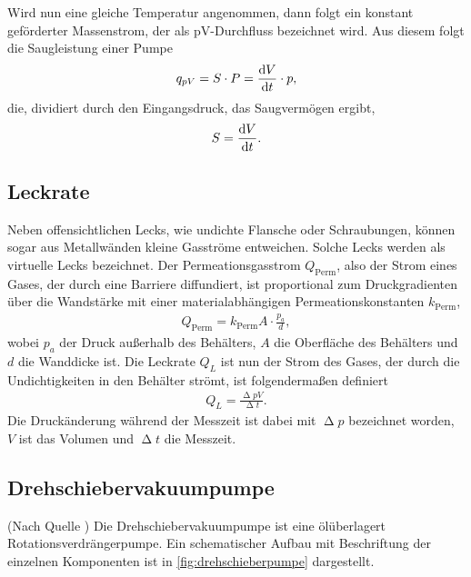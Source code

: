 \noindent
Wird nun eine gleiche Temperatur angenommen, dann folgt ein konstant geförderter Massenstrom, der als pV-Durchfluss bezeichnet wird. Aus diesem folgt die Saugleistung einer Pumpe
\begin{align}
    q_{pV} = S\cdot P=\frac{\text dV}{\text dt}\cdot p,
\end{align}
die, dividiert durch den Eingangsdruck, das Saugvermögen ergibt,
\begin{align}
    S=\frac{\text dV}{\text dt}.
\end{align}

\subsection{Leckrate}
\label{subsec:leckrate}

Neben offensichtlichen Lecks, wie undichte Flansche oder Schraubungen, können sogar aus Metallwänden kleine Gasströme entweichen. Solche Lecks werden als virtuelle Lecks bezeichnet.
Der Permeationsgasstrom $Q_{\text{Perm}}$, also der Strom eines Gases, der durch eine Barriere diffundiert, ist proportional zum Druckgradienten über die Wandstärke mit einer materialabhängigen Permeationskonstanten $k_{\text{Perm}}$,
\begin{align}
    \label{eqn:permeaStrom}
    Q_{\text{Perm}} = k_{\text{Perm}} A\cdot\frac{p_a}{d},
\end{align}
wobei $p_a$ der Druck außerhalb des Behälters, $A$ die Oberfläche des Behälters und $d$ die Wanddicke ist. Die Leckrate $Q_L$ ist nun der Strom des Gases, der durch die Undichtigkeiten in den Behälter strömt, ist folgendermaßen definiert
\begin{align}
    Q_L=\frac{\upDelta p V}{\upDelta t}.
\end{align}
Die Druckänderung während der Messzeit ist dabei mit $\upDelta p$ bezeichnet worden, $V$ ist das Volumen und $\upDelta t$ die Messzeit.

\subsection{Drehschiebervakuumpumpe}
\label{subsec:Drehschieberpumpe}

(Nach Quelle \cite{Drehschiebervakuumpumpen}) Die Drehschiebervakuumpumpe ist eine ölüberlagert Rotationsverdrängerpumpe. Ein schematischer Aufbau mit Beschriftung der einzelnen Komponenten ist in \autoref{fig:drehschieberpumpe} dargestellt.

